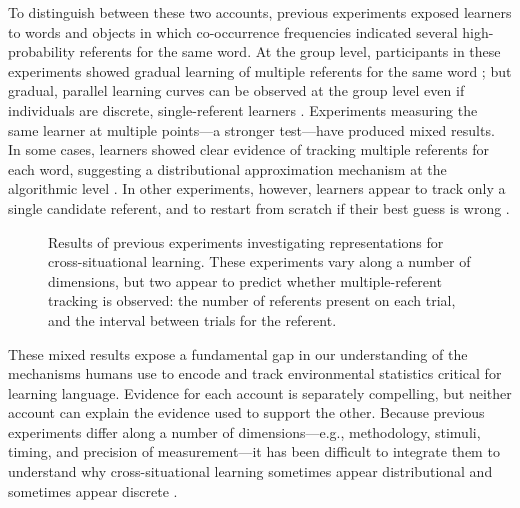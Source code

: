 \documentclass[authoryear,review]{elsarticle}
\begin{document}
To distinguish between these two accounts, previous experiments exposed learners to words and objects in which co-occurrence frequencies indicated several high-probability referents for the same word. At the group level, participants in these experiments showed gradual learning of multiple referents for the same word \citep[e.g.,][]{Vouloumanos2008, Yurovsky2013}; but gradual, parallel learning curves can be observed at the group level even if individuals are discrete, single-referent learners \citep{Gallistel2004, Medina2011}. Experiments measuring the same learner at multiple points---a stronger test---have produced mixed results. In some cases, learners showed clear evidence of tracking multiple referents for each word, suggesting a distributional approximation mechanism at the algorithmic level \citep{Smith2011a, Yurovsky2013, Dautriche2014}. In other experiments, however, learners appear to track only a single candidate referent, and to restart from scratch if their best guess is wrong \citep{Medina2011, Trueswell2013}. 

 \begin{figure}[tb]
	\caption{\label{fig:mrefs} Results of previous experiments investigating representations for cross-situational learning. These experiments vary along a number of dimensions, but two appear to predict whether multiple-referent tracking is observed: the number of referents present on each trial, and the interval between trials for the referent.}
\end{figure}

These mixed results expose a fundamental gap in our understanding of the mechanisms humans use to encode and track environmental statistics critical for learning language. Evidence for each account is separately compelling, but neither account can explain the evidence used to support the other. Because previous experiments differ along a number of dimensions---e.g., methodology, stimuli, timing, and precision of measurement---it has been difficult to integrate them to understand why cross-situational learning sometimes appear distributional and sometimes appear discrete \citep[for a review, see][]{Yurovsky2014}. 
\end{document}
